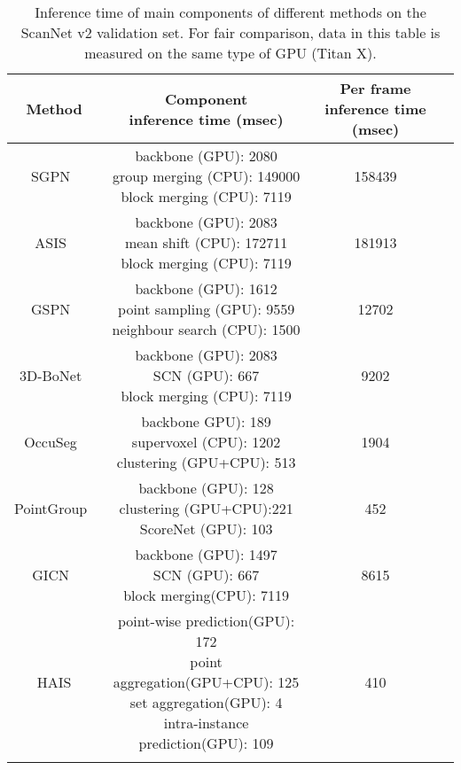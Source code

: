 \documentclass[10pt,twocolumn,letterpaper]{article}
\newcommand{\thename}{HAIS}
\begin{document}
\begin{table*}[htb]
    \centering 
    \caption{Inference time of main components of different methods on the ScanNet v2 validation set. For fair comparison, data in this table is measured on the same type of GPU (Titan X).}
    \small
    \begin{tabular}{cccc}
    \toprule
     Method  & \makecell{Component \\inference time (msec)} & \makecell{Per frame \\inference time (msec)}\\ 
    \midrule
    SGPN~\cite{SGPN}&\makecell{backbone (GPU): 2080\\group merging (CPU): 149000\\ block merging (CPU): 7119}& 158439\\
    \hline
    ASIS~\cite{ASIS}&\makecell{backbone (GPU): 2083\\mean shift (CPU): 172711\\block merging (CPU): 7119}&181913\\
    \hline
    GSPN~\cite{GSPN}&\makecell{backbone (GPU): 1612\\point sampling (GPU): 9559\\neighbour search (CPU): 1500} & 12702 \\
    \hline
    3D-BoNet~\cite{BoNet}&\makecell{backbone (GPU): 2083\\SCN (GPU): 667\\block merging (CPU): 7119} & 9202\\
    \hline
    OccuSeg~\cite{OccuSeg}&\makecell{backbone GPU): 189\\supervoxel (CPU): 1202\\clustering (GPU+CPU): 513}&1904\\
    \hline
    PointGroup~\cite{PointGroup}&\makecell{backbone (GPU): 128\\clustering (GPU+CPU):221 \\ScoreNet (GPU): 103 }  & 452\\
    \hline
    GICN~\cite{GICN} & \makecell{backbone (GPU): 1497\\SCN (GPU): 667\\block merging(CPU): 7119} & 8615\\
    \hline
    \thename&\makecell{point-wise prediction(GPU): 172\\point aggregation(GPU+CPU): 125 \\set aggregation(GPU): 4\\intra-instance prediction(GPU): 109}& 410\\
    \bottomrule
    \label{tab:infer_detail}
    \end{tabular}
\end{table*}
\end{document}
